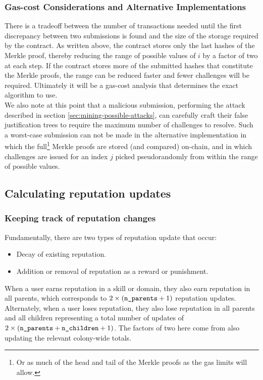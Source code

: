 \subsubsection*{Gas-cost Considerations and Alternative Implementations}
There is a tradeoff between the number of transactions needed until the first discrepancy between two submissions is found and the size of the storage required by the contract. As written above, the contract stores only the last hashes of the Merkle proof, thereby reducing the range of possible values of $i$ by a factor of two at each step. If the contract stores more of the submitted hashes that constitute the Merkle proofs, the range can be reduced faster and fewer challenges will be required. Ultimately it will be a gas-cost analysis that determines the exact algorithm to use.\\
We also note at this point that a malicious submission, performing the attack described in section \ref{sec:mining-possible-attacks}, can carefully craft their false justification trees to require the maximum number of challenges to resolve. Such a worst-case submission can not be made in the alternative implementation in which the full\footnote{Or as much of the head and tail of the Merkle proofs as the gas limits will allow.} Merkle proofs are stored (and compared) on-chain, and in which challenges are issued for an index $j$ picked pseudorandomly from within the range of possible values.

\subsection{Calculating reputation updates}\label{sec:calculating-reputation-updates}
%
\subsubsection{Keeping track of reputation changes}
%
Fundamentally, there are two types of reputation update that occur:
\begin{itemize}
 \item Decay of existing reputation.
 \item Addition or removal of reputation as a reward or punishment.
\end{itemize}

When a user earns reputation in a skill or domain, they also earn reputation in all parents, which corresponds to $2\times\left(\texttt{n\_parents}+1\right)$ reputation updates. Alternately, when a user loses reputation, they also lose reputation in all parents and all children representing a total number of updates of $2\times\left(\texttt{n\_parents} + \texttt{n\_children} + 1\right)$. The factors of two here come from also updating the relevant colony-wide totals.

